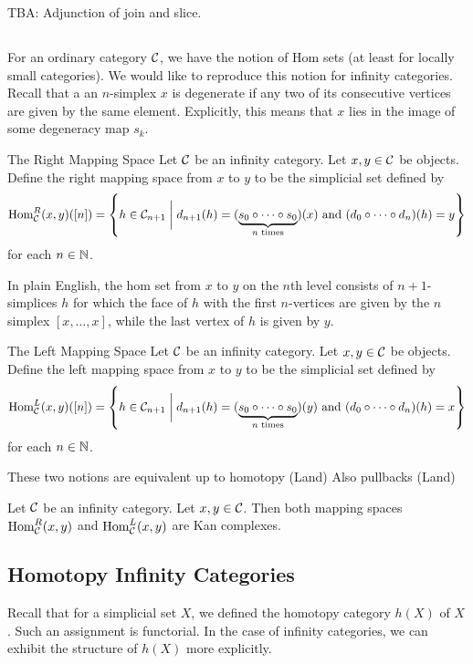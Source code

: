 \documentclass[a4paper]{article}
\begin{document}
TBA: Adjunction of join and slice. 

\subsection{}
For an ordinary category $\mathcal{C}$, we have the notion of Hom sets (at least for locally small categories). We would like to reproduce this notion for infinity categories. \\

Recall that a an $n$-simplex $x$ is degenerate if any two of its consecutive vertices are given by the same element. Explicitly, this means that $x$ lies in the image of some degeneracy map $s_k$. 

\begin{defn}{The Right Mapping Space}{} Let $\mathcal{C}$ be an infinity category. Let $x,y\in\mathcal{C}$ be objects. Define the right mapping space from $x$ to $y$ to be the simplicial set defined by $$\operatorname{Hom}_{\mathcal{C}}^R(x,y)([n])=\left\{h\in\mathcal{C}_{n+1}\;\bigg{|}\;d_{n+1}(h)=(\underbrace{s_0\circ\cdots\circ s_0}_{n\text{ times}})(x)\text{ and }(d_0\circ\cdots\circ d_n)(h)=y\right\}$$ for each $n\in\mathbb{N}$. 
\end{defn}

In plain English, the hom set from $x$ to $y$ on the $n$th level consists of $n+1$-simplices $h$ for which the face of $h$ with the first $n$-vertices are given by the $n$ simplex $[x,\dots,x]$, while the last vertex of $h$ is given by $y$. 

\begin{defn}{The Left Mapping Space}{} Let $\mathcal{C}$ be an infinity category. Let $x,y\in\mathcal{C}$ be objects. Define the left mapping space from $x$ to $y$ to be the simplicial set defined by $$\operatorname{Hom}_{\mathcal{C}}^L(x,y)([n])=\left\{h\in\mathcal{C}_{n+1}\;\bigg{|}\;d_{n+1}(h)=(\underbrace{s_0\circ\cdots\circ s_0}_{n\text{ times}})(y)\text{ and }(d_0\circ\cdots\circ d_n)(h)=x\right\}$$ for each $n\in\mathbb{N}$. 
\end{defn}

These two notions are equivalent up to homotopy (Land) Also pullbacks (Land)

\begin{prp}{}{} Let $\mathcal{C}$ be an infinity category. Let $x,y\in\mathcal{C}$. Then both mapping spaces $\operatorname{Hom}_{\mathcal{C}}^R(x,y)$ and $\operatorname{Hom}_{\mathcal{C}}^L(x,y)$ are Kan complexes. 
\end{prp}

\subsection{Homotopy Infinity Categories}
Recall that for a simplicial set $X$, we defined the homotopy category $h(X)$ of $X$. Such an assignment is functorial. In the case of infinity categories, we can exhibit the structure of $h(X)$ more explicitly. 
\end{document}
